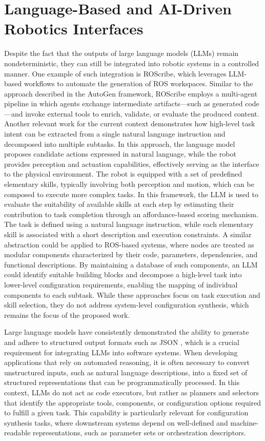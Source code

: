 \section{Language-Based and AI-Driven Robotics Interfaces}
Despite the fact that the outputs of large language models (LLMs) remain nondeterministic, they can still
be integrated into robotic systems in a controlled manner. One example of such integration is ROScribe, 
which leverages LLM-based workflows to automate the generation of ROS workspaces. Similar to the approach 
described in the AutoGen \cite{wu2023autogen} framework, ROScribe employs a multi-agent pipeline in which agents exchange intermediate
artifacts—such as generated code—and invoke external tools to enrich, validate, or evaluate the produced content.
Another relevant work for the current context \cite{ahn2022saycan} demonstrates how high-level task intent
can be extracted from a single natural language instruction and decomposed into multiple subtasks. In this approach, the 
language model proposes candidate actions expressed in natural language, while the robot provides perception and actuation 
capabilities, effectively serving as the interface to the physical environment. The robot is equipped with a set of predefined 
elementary skills, typically involving both perception and motion, which can be composed to execute more complex tasks.
In this framework, the LLM is used to evaluate the suitability of available skills at each step by estimating their contribution 
to task completion through an affordance-based scoring mechanism. The task is defined using a natural language instruction, 
while each elementary skill is associated with a short description and execution constraints. A similar abstraction could be 
applied to ROS-based systems, where nodes are treated as modular components characterized by their code, parameters, dependencies,
and functional descriptions. By maintaining a database of such components, an LLM could identify suitable building blocks and decompose
a high-level task into lower-level configuration requirements, enabling the mapping of individual components to each subtask.
While these approaches focus on task execution and skill selection, they do not address system-level configuration synthesis, 
which remains the focus of the proposed work.

Large language models have consistently demonstrated the ability to generate and adhere to structured output formats such as JSON \cite{thinkinsidejson2025},
which is a crucial requirement for integrating LLMs into software systems. When developing applications that rely on automated 
reasoning, it is often necessary to convert unstructured inputs, such as natural language descriptions, into a fixed set of 
structured representations that can be programmatically processed. In this context, LLMs do not act as code executors, but rather 
as planners and selectors that identify the appropriate tools, components, or configuration options required to fulfill a given task.
This capability is particularly relevant for configuration synthesis tasks,
where downstream systems depend on well-defined and machine-readable representations, such as parameter sets or orchestration descriptors.

